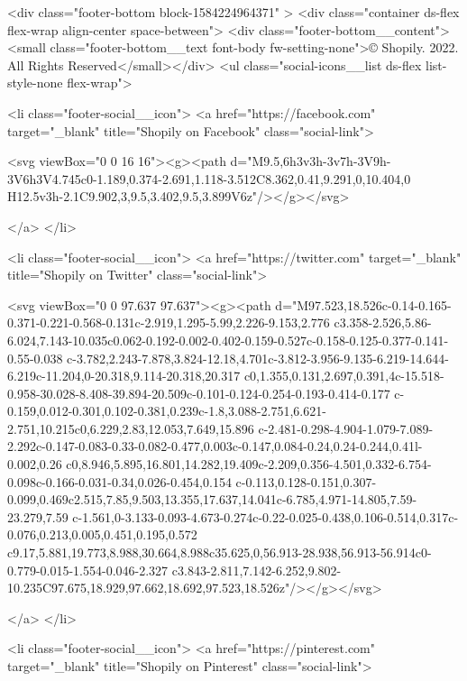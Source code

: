 {{{{{{{<div class="footer-bottom block-1584224964371" >
  <div class="container ds-flex flex-wrap align-center space-between">
    <div class="footer-bottom__content"><small class="footer-bottom__text font-body fw-setting-none">© Shopily. 2022. All Rights Reserved</small></div>
<ul class="social-icons__list ds-flex list-style-none flex-wrap">
  
    
    
    
<li class="footer-social__icon">
        <a href="https://facebook.com" target="_blank" title="Shopily on Facebook" class="social-link">
          
<svg viewBox="0 0 16 16"><g><path d="M9.5,6h3v3h-3v7h-3V9h-3V6h3V4.745c0-1.189,0.374-2.691,1.118-3.512C8.362,0.41,9.291,0,10.404,0 H12.5v3h-2.1C9.902,3,9.5,3.402,9.5,3.899V6z"/></g></svg>

        </a>
      </li>
    
    
    
<li class="footer-social__icon">
        <a href="https://twitter.com" target="_blank" title="Shopily on Twitter" class="social-link">
          
<svg viewBox="0 0 97.637 97.637"><g><path d="M97.523,18.526c-0.14-0.165-0.371-0.221-0.568-0.131c-2.919,1.295-5.99,2.226-9.153,2.776 c3.358-2.526,5.86-6.024,7.143-10.035c0.062-0.192-0.002-0.402-0.159-0.527c-0.158-0.125-0.377-0.141-0.55-0.038 c-3.782,2.243-7.878,3.824-12.18,4.701c-3.812-3.956-9.135-6.219-14.644-6.219c-11.204,0-20.318,9.114-20.318,20.317 c0,1.355,0.131,2.697,0.391,4c-15.518-0.958-30.028-8.408-39.894-20.509c-0.101-0.124-0.254-0.193-0.414-0.177 c-0.159,0.012-0.301,0.102-0.381,0.239c-1.8,3.088-2.751,6.621-2.751,10.215c0,6.229,2.83,12.053,7.649,15.896 c-2.481-0.298-4.904-1.079-7.089-2.292c-0.147-0.083-0.33-0.082-0.477,0.003c-0.147,0.084-0.24,0.24-0.244,0.41l-0.002,0.26 c0,8.946,5.895,16.801,14.282,19.409c-2.209,0.356-4.501,0.332-6.754-0.098c-0.166-0.031-0.34,0.026-0.454,0.154 c-0.113,0.128-0.151,0.307-0.099,0.469c2.515,7.85,9.503,13.355,17.637,14.041c-6.785,4.971-14.805,7.59-23.279,7.59 c-1.561,0-3.133-0.093-4.673-0.274c-0.22-0.025-0.438,0.106-0.514,0.317c-0.076,0.213,0.005,0.451,0.195,0.572 c9.17,5.881,19.773,8.988,30.664,8.988c35.625,0,56.913-28.938,56.913-56.914c0-0.779-0.015-1.554-0.046-2.327 c3.843-2.811,7.142-6.252,9.802-10.235C97.675,18.929,97.662,18.692,97.523,18.526z"/></g></svg>


        </a>
      </li>
    
    
    
<li class="footer-social__icon">
        <a href="https://pinterest.com" target="_blank" title="Shopily on Pinterest" class="social-link">
          
}}}}}}}
